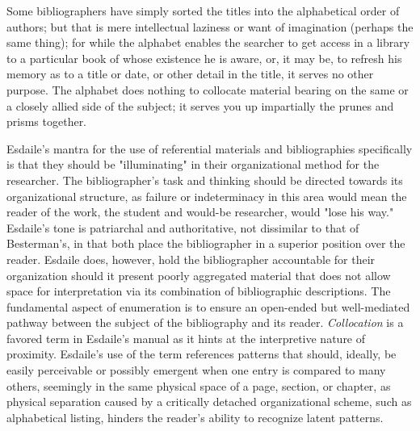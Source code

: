 \begin{displayquote}
Some bibliographers have simply sorted the titles into the alphabetical order of authors; but that is mere intellectual laziness or want of imagination (perhaps the same thing); for while the alphabet enables the searcher to get access in a library to a particular book of whose existence he is aware, or, it may be, to refresh his memory as to a title or date, or other detail in the title, it serves no other purpose. The alphabet does nothing to collocate material bearing on the same or a closely allied side of the subject; it serves you up impartially the prunes and prisms together.\autocite[364]{esdaile_students_1954}
\end{displayquote}
Esdaile's mantra for the use of referential materials and bibliographies specifically is that they should be "illuminating" in their organizational method for the researcher.\autocite[35]{esdaile_students_1954} The bibliographer's task and thinking should be directed towards its organizational structure, as failure or indeterminacy in this area would mean the reader of the work, the student and would-be researcher, would "lose his way."\autocite[20]{esdaile_students_1954} Esdaile's tone is patriarchal and authoritative, not dissimilar to that of Besterman's, in that both place the bibliographer in a superior position over the reader. Esdaile does, however, hold the bibliographer accountable for their organization should it present poorly aggregated material that does not allow space for interpretation via its combination of bibliographic descriptions. The fundamental aspect of enumeration is to ensure an open-ended but well-mediated pathway between the subject of the bibliography and its reader. \textit{Collocation} is a favored term in Esdaile's manual as it hints at the interpretive nature of proximity. Esdaile's use of the term references patterns that should, ideally, be easily perceivable or possibly emergent when one entry is compared to many others, seemingly in the same physical space of a page, section, or chapter, as physical separation caused by a critically detached organizational scheme, such as alphabetical listing, hinders the reader's ability to recognize latent patterns. 

